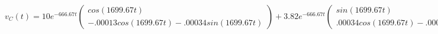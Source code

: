 \documentclass[preview]{standalone}
\begin{document}
\begin{center}
\[
                                v_C(t) = 10e^{-666.67t}
                                \begin{pmatrix} 
                                cos(1699.67t) \\ 
                                -.00013cos(1699.67t) - .00034sin(1699.67t)
                                \end{pmatrix} + 3.82e^{-666.67t}
                                \begin{pmatrix} 
                                sin(1699.67t) \\ 
                                .00034cos(1699.67t) - .00013sin(1699.67t)
                                \end{pmatrix}
                        \]
\end{center}
\end{document}
